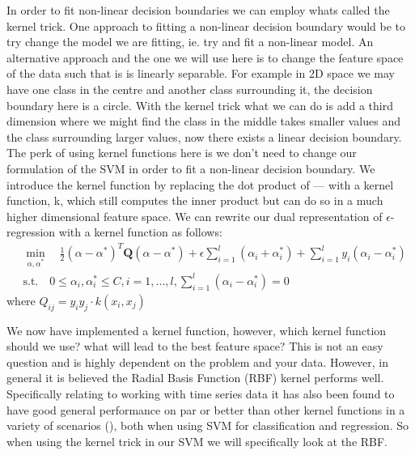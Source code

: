 \documentclass[11pt]{article}
\theoremstyle{definition}
\begin{document}
In order to fit non-linear decision boundaries we can employ whats called the kernel trick. One approach to fitting a non-linear decision boundary would be to try change the model we are fitting, ie. try and fit a non-linear model. An alternative approach and the one we will use here is to change the feature space of the data such that is is linearly separable. For example in 2D space we may have one class in the centre and another class surrounding it, the decision boundary here is a circle. With the kernel trick what we can do is add a third dimension where we might find the class in the middle takes smaller values and the class surrounding larger values, now there exists a linear decision boundary. The perk of using kernel functions here is we don't need to change our formulation of the SVM in order to fit a non-linear decision boundary. We introduce the kernel function by replacing the dot product of --- with a kernel function, k, which still computes the inner product but can do so in a much higher dimensional feature space. We can rewrite our dual representation of $\epsilon$-regression with a kernel function as follows:
\begin{align}
    &{} \min_{\alpha, \alpha^{*}} \quad \frac{1}{2} (\alpha - \alpha^{*})^{T} \mathbf{Q} (\alpha - \alpha^{*}) + \epsilon \sum_{i=1}^{l} (\alpha_{i} + \alpha_{i}^{*}) + \sum_{i=1}^{l} y_{i} (\alpha_{i} - \alpha_{i}^{*}) \\
    & \text{s.t.} \quad 0 \leq \alpha_{i}, \alpha_{i}^{*} \leq C, i=1,...,l, \sum_{i=1}^{l} (\alpha_{i} - \alpha_{i}^{*}) = 0
\end{align}
where $Q_{ij} = y_{i}  y_{j}  \cdot k(x_{i}, x_{j})$

We now have implemented a kernel function, however, which kernel function should we use? what will lead to the best feature space? This is not an easy question and is highly dependent on the problem and your data. However, in general it is believed the Radial Basis Function (RBF) kernel performs well. Specifically relating to working with time series data it has also been found to have good general performance on par or better than other kernel functions in a variety of scenarios (\cite{ruping2001svm}), both when using SVM for classification and regression. So when using the kernel trick in our SVM we will specifically look at the RBF.

\end{document}
